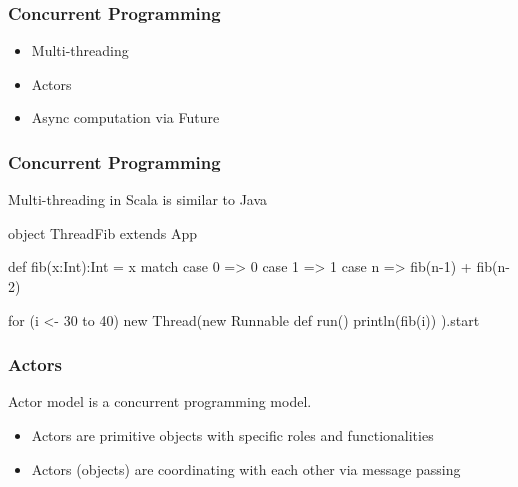 \documentclass{beamer}
\newcommand{\beb}{\begin{exampleblock}}
\newcommand{\eeb}{\end{exampleblock}}
\begin{document}
\begin{frame}[fragile]
\frametitle{Concurrent Programming}

\begin{itemize}
\item Multi-threading
\item Actors
\item Async computation via Future
\end{itemize}

\end{frame}

\begin{frame}[fragile]
\frametitle{Concurrent Programming}

Multi-threading in Scala is similar to Java
\beb{}
\begin{code}
  object ThreadFib extends App {
    def fib(x:Int):Int = x match {
      case 0 => 0
      case 1 => 1
      case n => fib(n-1) + fib(n-2)
    }

    for (i <- 30 to 40) { 
      new Thread(new Runnable {
        def run() {
          println(fib(i))
        }
      }).start
    }
  }
\end{code}
\eeb
\end{frame}


\begin{frame}[fragile]
\frametitle{Actors}
Actor model is a concurrent programming model. 
\begin{itemize}
 \item Actors are primitive objects with specific roles and functionalities
 \item Actors (objects) are coordinating with each other via message passing
\end{itemize}
\end{frame}
\end{document}
